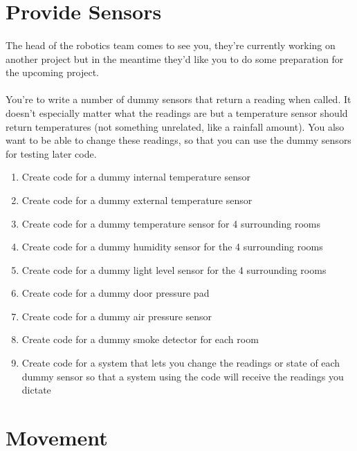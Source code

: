 \documentclass[11pt]{book}
\begin{document}
\section{Provide Sensors}

\paragraph{} The head of the robotics team comes to see you, they're currently working on another project but in the meantime they'd like you to do some preparation for the upcoming project.

\paragraph{} You're to write a number of dummy sensors that return a reading when called. It doesn't especially matter what the readings are but a temperature sensor should return temperatures (not something unrelated, like a rainfall amount). You also want to be able to change these readings, so that you can use the dummy sensors for testing later code.

\begin{enumerate}
\item Create code for a dummy internal temperature sensor
\item Create code for a dummy external temperature sensor
\item Create code for a dummy temperature sensor for 4 surrounding rooms
\item Create code for a dummy humidity sensor for the 4 surrounding rooms
\item Create code for a dummy light level sensor for the 4 surrounding rooms
\item Create code for a dummy door pressure pad
\item Create code for a dummy air pressure sensor
\item Create code for a dummy smoke detector for each room
\item Create code for a system that lets you change the readings or state of each dummy sensor so that a system using the code will receive the readings you dictate
\end{enumerate}

\clearpage

\section{Movement}
\end{document}
